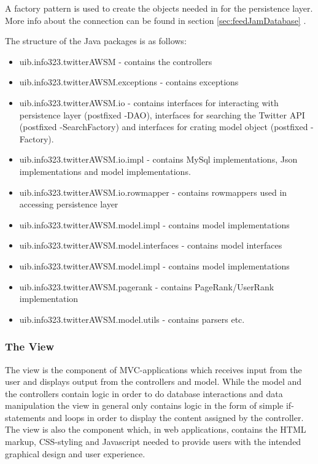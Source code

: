 A factory pattern is used to create the objects needed in for the persistence layer. 
More info about the connection can be found in section \ref{sec:feedJamDatabase} .

The structure of the Java packages is as follows:

\begin{itemize}
  \item uib.info323.twitterAWSM - contains the controllers
  \item uib.info323.twitterAWSM.exceptions - contains exceptions
  \item uib.info323.twitterAWSM.io - contains interfaces for interacting with persistence layer (postfixed -DAO), interfaces for searching the Twitter API (postfixed -SearchFactory) and interfaces for crating model object (postfixed -Factory).
  \item uib.info323.twitterAWSM.io.impl - contains MySql implementations, Json implementations and model implementations. 
  \item uib.info323.twitterAWSM.io.rowmapper - contains rowmappers used in accessing persistence layer
  \item uib.info323.twitterAWSM.model.impl - contains model implementations
  \item uib.info323.twitterAWSM.model.interfaces - contains model interfaces
  \item uib.info323.twitterAWSM.model.impl - contains model implementations
  \item uib.info323.twitterAWSM.pagerank - contains PageRank/UserRank implementation
  \item uib.info323.twitterAWSM.model.utils - contains parsers etc.
\end{itemize}


\subsubsection{The View}
The view is the component of MVC-applications which receives input from the user and displays output from the controllers and model. While the model and the controllers contain logic in order to do database interactions and data manipulation the view in general only contains logic in the form of simple if-statements and loops in order to display the content assigned by the controller. The view is also the component which, in web applications, contains the HTML markup, CSS-styling and Javascript needed to provide users with the intended graphical design and user experience.

